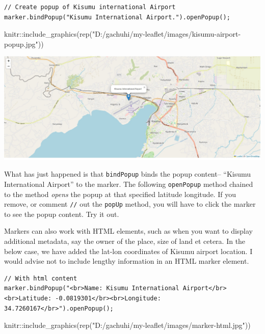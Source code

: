 \documentclass[
]{book}
\newenvironment{Shaded}{\begin{snugshade}}{\end{snugshade}}
\newcommand{\FunctionTok}[1]{\textcolor[rgb]{0.00,0.00,0.00}{#1}}
\newcommand{\NormalTok}[1]{#1}
\newcommand{\SpecialCharTok}[1]{\textcolor[rgb]{0.00,0.00,0.00}{#1}}
\newcommand{\StringTok}[1]{\textcolor[rgb]{0.31,0.60,0.02}{#1}}
\begin{document}
\begin{verbatim}
// Create popup of Kisumu international Airport
marker.bindPopup("Kisumu International Airport.").openPopup();
\end{verbatim}

\begin{Shaded}
\begin{Highlighting}[]
\NormalTok{knitr}\SpecialCharTok{::}\FunctionTok{include\_graphics}\NormalTok{(}\FunctionTok{rep}\NormalTok{(}\StringTok{"D:/gachuhi/my{-}leaflet/images/kisumu{-}airport{-}popup.jpg"}\NormalTok{))}
\end{Highlighting}
\end{Shaded}

\includegraphics[width=26.43in]{../images/kisumu-airport-popup}

What has just happened is that \texttt{bindPopup} binds the popup content-- ``Kisumu International Airport'' to the marker. The following \texttt{openPopup} method chained to the method \emph{opens} the popup at that specified latitude longitude. If you remove, or comment \texttt{//} out the \texttt{popUp} method, you will have to click the marker to see the popup content. Try it out.

Markers can also work with HTML elements, such as when you want to display additional metadata, say the owner of the place, size of land et cetera. In the below case, we have added the lat-lon coordinates of Kisumu airport location. I would advise not to include lengthy information in an HTML marker element.

\begin{verbatim}
// With html content
marker.bindPopup("<br>Name: Kisumu International Airport</br><br>Latitude: -0.0819301</br><br>Longitude: 34.7260167</br>").openPopup();
\end{verbatim}

\begin{Shaded}
\begin{Highlighting}[]
\NormalTok{knitr}\SpecialCharTok{::}\FunctionTok{include\_graphics}\NormalTok{(}\FunctionTok{rep}\NormalTok{(}\StringTok{"D:/gachuhi/my{-}leaflet/images/marker{-}html.jpg"}\NormalTok{))}
\end{Highlighting}
\end{Shaded}
\end{document}
